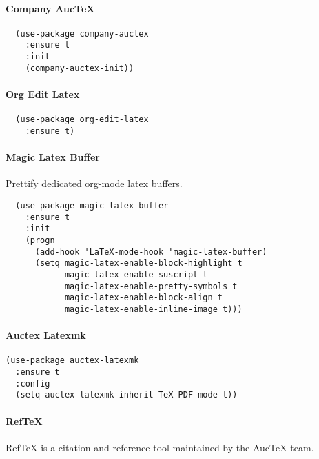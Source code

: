 \documentclass[11pt]{article}
\begin{document}
\paragraph*{Company AucTeX}
\label{sec:org7f14d47}

\begin{verbatim}
  (use-package company-auctex
    :ensure t
    :init
    (company-auctex-init))
\end{verbatim}

\paragraph*{Org Edit Latex}
\label{sec:org2583e34}

\begin{verbatim}
  (use-package org-edit-latex
    :ensure t)
\end{verbatim}

\paragraph*{Magic Latex Buffer}
\label{sec:orgfce3322}

Prettify dedicated org-mode latex buffers.

\begin{verbatim}
  (use-package magic-latex-buffer
    :ensure t
    :init
    (progn
      (add-hook 'LaTeX-mode-hook 'magic-latex-buffer)
      (setq magic-latex-enable-block-highlight t
            magic-latex-enable-suscript t
            magic-latex-enable-pretty-symbols t
            magic-latex-enable-block-align t
            magic-latex-enable-inline-image t)))
\end{verbatim}

\paragraph*{Auctex Latexmk}
\label{sec:org49fd60e}

\begin{verbatim}
(use-package auctex-latexmk
  :ensure t
  :config
  (setq auctex-latexmk-inherit-TeX-PDF-mode t))
\end{verbatim}

\paragraph*{RefTeX}
\label{sec:org3afe073}


RefTeX is a citation and reference tool maintained by the
AucTeX team.
\end{document}
